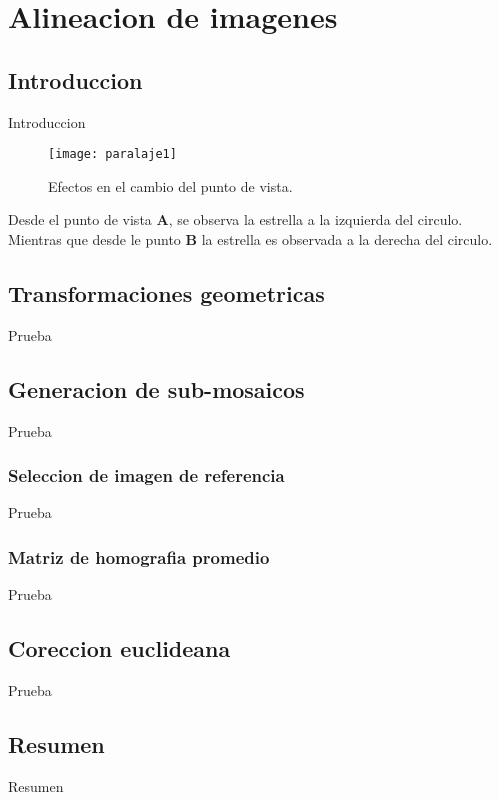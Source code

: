 \chapter{Alineacion de imagenes}
\label{capitulo3}

\section{Introduccion}

Introduccion

\begin{figure}[H]
	\centering
	\texttt{[image: paralaje1]}
	\caption[Paralaje - Efectos en el cambio de punto de vista]{Efectos en el cambio del punto de vista.}
	\label{imagen:paralaje}
\end{figure}

Desde el punto de vista \textbf{A}, se observa la estrella a la izquierda del circulo. Mientras que desde le punto \textbf{B} la estrella es observada a la derecha del circulo.

\section{Transformaciones geometricas}
Prueba

\section{Generacion de sub-mosaicos}
Prueba

\subsection{Seleccion de imagen de referencia}
Prueba

\subsection{Matriz de homografia promedio}
Prueba

\section{Coreccion euclideana}
Prueba

\section{Resumen}
Resumen



